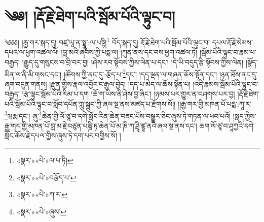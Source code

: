 \chapter{༄༅། །རྡོ་རྗེ་ཐེག་པའི་སྦོམ་པོའི་ལྟུང་བ།}༄༅༅། །རྒྱ་གར་སྐད་དུ། བཛྲ་ཡཱ་ན་སྠཱུ་:ལ་པཏྟི།\footnote{«སྣར་»«པེ་»ལ་པ་ཏི།} བོད་སྐད་དུ། རྡོ་རྗེ་ཐེག་པའི་སྦོམ་པོའི་ལྟུང་བ། དཔལ་རྡོ་རྗེ་སེམས་དཔའ་ལ་ཕྱག་འཚལ་ལོ། །བླ་མའི་ཞབས་ཀྱི་པདྨ་ལ། །ཀུན་ནས་དང་བས་ཕྱག་འཚལ་ཏེ། །སྦོམ་པོའི་ལྟུང་བ་རྣམ་པ་བརྒྱད། །རྒྱུད་དུ་གསུངས་བ་བྲི་བར་བྱ། །ཤེས་རབ་སྟོབས་ཀྱིས་ལེན་པ་དང་། །དེ་ཡི་བདུད་རྩི་སྟོབས་ཀྱིས་ལེན། །སྣོད་མིན་ལ་ནི་མི་གསང་དང་། །ཚོགས་ཀྱི་ནང་དུ་:རྩོད་པ་\footnote{«སྣར་»«པེ་»བརྩོད་པ་}དང་། །དད་ལྡན་ལ་གཞན་ཆོས་སྟོན་དང་། །ཉན་ཐོས་ནང་དུ་ཞག་བདུན་གནས། །རྫུན་གྱིས་རྣལ་འབྱོར་ང་རྒྱལ་བྱེད། །དད་པ་མེད་ལ་ཆོས་སྟོན་པ། །འདི་རྣམས་སྦོམ་པོའི་ལྟུང་བ་བརྒྱད། །རྩ་ལྟུང་སྦོམ་པོའི་རིམ་པ་དག །ཆོ་ག་ཡིས་ནི་ཤེས་བྱ་ཞིང་། །ཉམས་པར་གྱུར་ན་བཤགས་པར་བྱ། །རྡོ་རྗེ་ཐེག་པའི་སྦོམ་པོའི་ལྟུང་བ་སློབ་དཔོན་ཀླུ་སྒྲུབ་ཀྱི་ཞལ་སྔ་ནས་མཛད་པ་རྫོགས་སོ།། །།རྒྱ་གར་གྱི་མཁན་པོ་པདྨ་:ཀཱ་ར་\footnote{«སྣར་»«པེ་»ཀ་ར་}ཝརྨ་དང་། ཞུ་\footnote{«སྣར་»«པེ་»ཞུས་}ཆེན་གྱི་ལོ་ཙཱ་བ་དགེ་སློང་རིན་ཆེན་བཟང་པོས་བསྒྱུར་ཅིང་ཞུས་ཏེ་གཏན་ལ་ཕབ་པའོ། །སླད་ཀྱིས་རྒྱ་གར་གྱི་མཁན་པོ་བླ་མ་རྗེ་བཙུན་པཎྜི་ཏ་ཆེན་པོ་མ་ཎི་ཀ་ཤྲཱི་ཛྙཱ་ནའི་ཞལ་སྔ་ནས་དང་། ཆག་ལོ་ཙཱ་བ་ཤཱཀྱའི་དགེ་སློང་ཆོས་རྗེ་དཔལ་གྱིས་ཞུས་ཏེ་དག་པར་བགྱིས་སོ། ། 